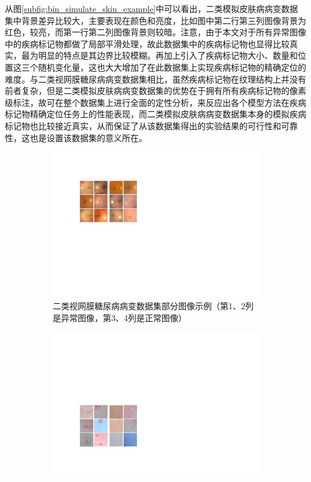 从图\ref{subfig:bin_simulate_skin_example}中可以看出，二类模拟皮肤病病变数据集中背景差异比较大，主要表现在颜色和亮度，比如图中第二行第三列图像背景为红色，较亮，而第一行第二列图像背景则较暗。注意，由于本文对于所有异常图像中的疾病标记物都做了局部平滑处理，故此数据集中的疾病标记物也显得比较真实，最为明显的特点是其边界比较模糊。再加上引入了疾病标记物大小、数量和位置这三个随机变化量，这也大大增加了在此数据集上实现疾病标记物的精确定位的难度。与二类视网膜糖尿病病变数据集相比，虽然疾病标记物在纹理结构上并没有前者复杂，但是二类模拟皮肤病病变数据集的优势在于拥有所有疾病标记物的像素级标注，故可在整个数据集上进行全面的定性分析，来反应出各个模型方法在疾病标记物精确定位任务上的性能表现，而二类模拟皮肤病病变数据集本身的模拟疾病标记物也比较接近真实，从而保证了从该数据集得出的实验结果的可行性和可靠性，这也是设置该数据集的意义所在。
\begin{figure}[h]
	\centering
	\begin{subfigure}{0.48\textwidth}
		\centering
		\includegraphics[width=1\textwidth]{figure/bin_dr_ds_example}
		\caption{二类视网膜糖尿病病变数据集部分图像示例（第1、2列是异常图像，第3、4列是正常图像）}
		\label{subfig:bin_dr_ds_example}
	\end{subfigure}
	\quad
	\begin{subfigure}{0.48\textwidth}
		\centering
		\includegraphics[width=1\textwidth]{figure/bin_simulate_skin_example}

\end{subfigure}
\end{figure}
